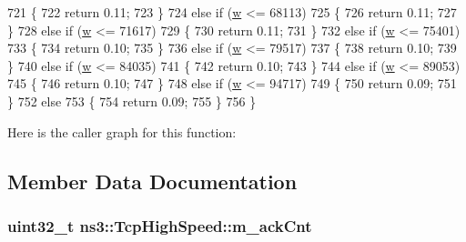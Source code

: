 \begin{DoxyCode}
721     \{
722       \textcolor{keywordflow}{return} 0.11;
723     \}
724   \textcolor{keywordflow}{else} \textcolor{keywordflow}{if} (\hyperlink{lte_2model_2fading-traces_2fading__trace__generator_8m_afd61ec66f9d7b807eece6eb12c781844}{w} <= 68113)
725     \{
726       \textcolor{keywordflow}{return} 0.11;
727     \}
728   \textcolor{keywordflow}{else} \textcolor{keywordflow}{if} (\hyperlink{lte_2model_2fading-traces_2fading__trace__generator_8m_afd61ec66f9d7b807eece6eb12c781844}{w} <= 71617)
729     \{
730       \textcolor{keywordflow}{return} 0.11;
731     \}
732   \textcolor{keywordflow}{else} \textcolor{keywordflow}{if} (\hyperlink{lte_2model_2fading-traces_2fading__trace__generator_8m_afd61ec66f9d7b807eece6eb12c781844}{w} <= 75401)
733     \{
734       \textcolor{keywordflow}{return} 0.10;
735     \}
736   \textcolor{keywordflow}{else} \textcolor{keywordflow}{if} (\hyperlink{lte_2model_2fading-traces_2fading__trace__generator_8m_afd61ec66f9d7b807eece6eb12c781844}{w} <= 79517)
737     \{
738       \textcolor{keywordflow}{return} 0.10;
739     \}
740   \textcolor{keywordflow}{else} \textcolor{keywordflow}{if} (\hyperlink{lte_2model_2fading-traces_2fading__trace__generator_8m_afd61ec66f9d7b807eece6eb12c781844}{w} <= 84035)
741     \{
742       \textcolor{keywordflow}{return} 0.10;
743     \}
744   \textcolor{keywordflow}{else} \textcolor{keywordflow}{if} (\hyperlink{lte_2model_2fading-traces_2fading__trace__generator_8m_afd61ec66f9d7b807eece6eb12c781844}{w} <= 89053)
745     \{
746       \textcolor{keywordflow}{return} 0.10;
747     \}
748   \textcolor{keywordflow}{else} \textcolor{keywordflow}{if} (\hyperlink{lte_2model_2fading-traces_2fading__trace__generator_8m_afd61ec66f9d7b807eece6eb12c781844}{w} <= 94717)
749     \{
750       \textcolor{keywordflow}{return} 0.09;
751     \}
752   \textcolor{keywordflow}{else}
753     \{
754       \textcolor{keywordflow}{return} 0.09;
755     \}
756 \}
\end{DoxyCode}


Here is the caller graph for this function\+:




\subsection{Member Data Documentation}
\subsubsection[{\texorpdfstring{m\+\_\+ack\+Cnt}{m_ackCnt}}]{\setlength{\rightskip}{0pt plus 5cm}uint32\+\_\+t ns3\+::\+Tcp\+High\+Speed\+::m\+\_\+ack\+Cnt\hspace{0.3cm}{\ttfamily [private]}}\hypertarget{classns3_1_1TcpHighSpeed_aee2fcee158f034e4ec68a42a4564a2ec}{}\label{classns3_1_1TcpHighSpeed_aee2fcee158f034e4ec68a42a4564a2ec}


